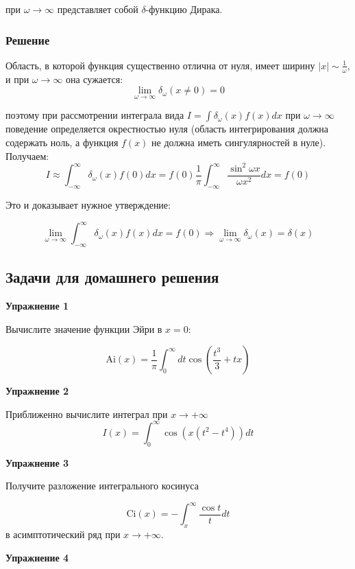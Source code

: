 \documentclass[a4paper,12pt]{article}
\begin{document}
\noindent
при $\omega\to\infty$ представляет собой $\delta$-функцию Дирака.


\subsubsection*{Решение}

Область, в которой функция существенно отлична от нуля, имеет ширину
$\left|x\right|\sim\frac{1}{\omega}$, и при $\omega\to\infty$ она
сужается:
\[
\lim_{\omega\to\infty}\delta_{\omega}(x\neq0)=0
\]

\noindent
поэтому при рассмотрении интеграла вида $I=\int\delta_{\omega}(x)f(x)dx$
при $\omega\to\infty$ поведение определяется окрестностью нуля (область
интегрирования должна содержать ноль, а функция $f\left(x\right)$
не должна иметь сингулярностей в нуле). Получаем:
\[
I\approx\int_{-\infty}^{\infty}\delta_{\omega}(x)f(0)dx=f(0)\frac{1}{\pi}\int_{-\infty}^{\infty}\frac{\sin^{2}\omega x}{\omega x^{2}}dx=f(0)
\]

\noindent
Это и доказывает нужное утверждение:

\[
\lim_{\omega\to\infty}\int_{-\infty}^{\infty}\delta_{\omega}(x)f(x)dx=f(0)\Rightarrow\lim_{\omega\to\infty}\delta_{\omega}(x)=\delta(x)
\]


\subsection*{Задачи для домашнего решения}

\noindent \textbf{Упражнение 1}

\noindent Вычислите значение функции Эйри в $x=0$:

$$
\mathrm{Ai}(x)	=\frac{1}{\pi}\int_{0}^{\infty}dt\cos(\frac{t^{3}}{3}+tx)
$$

\vspace{15pt}
\noindent \textbf{Упражнение 2}

\noindent Приближенно вычислите интеграл при $x\rightarrow+\infty$
$$
I(x)	=\int_{0}^{\infty}\cos(x(t^{2}-t^{4}))dt
$$

\vspace{15pt}
\noindent \textbf{Упражнение 3}

\noindent Получите разложение интегрального косинуса

$$
\mathrm{Ci}(x)	=-\int_{x}^{\infty}\frac{\cos t}{t}dt
$$
\noindent в асимптотический ряд при $x\rightarrow+\infty$.

\vspace{15pt}
\noindent \textbf{Упражнение 4}
\end{document}
